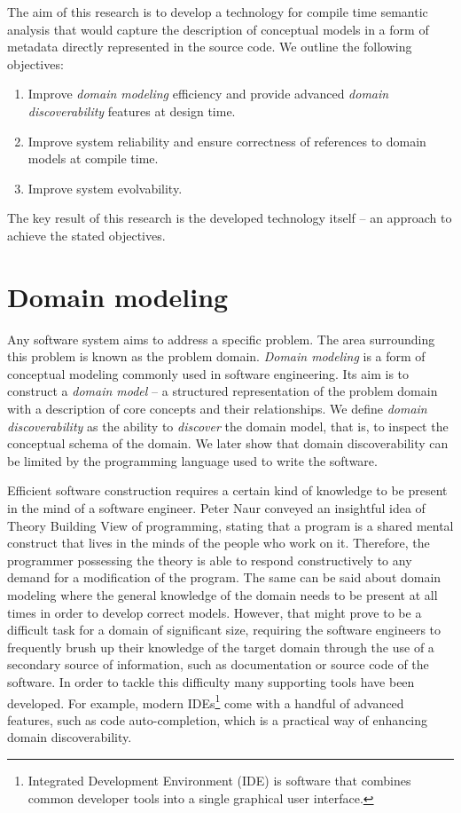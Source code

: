 The aim of this research is to develop a technology for compile time semantic analysis that would capture the description of conceptual models in a form of metadata directly represented in the source code. 
We outline the following objectives:
\begin{enumerate}
    \item Improve \textit{domain modeling} efficiency and provide advanced \textit{domain discoverability} features at design time.
    \item Improve system reliability and ensure correctness of references to domain models at compile time.
    \item Improve system evolvability.
\end{enumerate}

The key result of this research is the developed technology itself -- an approach to achieve the stated objectives.

\section{Domain modeling}
Any software system aims to address a specific problem.
The area surrounding this problem is known as the problem domain. \textit{Domain modeling} is a form of conceptual modeling commonly used in software engineering.
Its aim is to construct a \textit{domain model} -- a structured representation of the problem domain with a description of core concepts and their relationships.
We define \textit{domain discoverability} as the ability to \textit{discover} the domain model, that is, to inspect the conceptual schema of the domain.
We later show that domain discoverability can be limited by the programming language used to write the software.

\n

Efficient software construction requires a certain kind of knowledge to be present in the mind of a software engineer. 
Peter Naur \cite{naur} conveyed an insightful idea of Theory Building View of programming, stating that a program is a shared mental construct that lives in the minds of the people who work on it.
Therefore, the programmer possessing the theory is able to respond constructively to any demand for a modification of the program.
The same can be said about domain modeling where the general knowledge of the domain needs to be present at all times in order to develop correct models.
However, that might prove to be a difficult task for a domain of significant size, requiring the software engineers to frequently brush up their knowledge of the target domain through the use of a secondary source of information, such as documentation or source code of the software.
In order to tackle this difficulty many supporting tools have been developed. For example, modern IDEs\footnote{Integrated Development Environment (IDE) is software that combines common developer tools into a single graphical user interface.} come with a handful of advanced features, such as code auto-completion, which is a practical way of enhancing domain discoverability.

